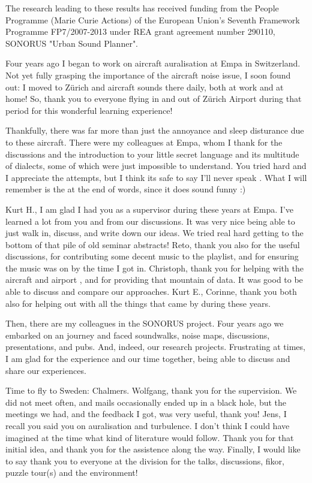 The research leading to these results has received funding from
the People Programme (Marie Curie Actions) of the European Union's Seventh
Framework Programme FP7/2007-2013 under REA grant agreement number 290110,
SONORUS "Urban Sound Planner".

Four years ago I began to work on aircraft auralisation at Empa in Switzerland.
Not yet fully grasping the importance of the aircraft noise issue, I soon found
out: I moved to Z\"{u}rich and  aircraft sounds there daily, both
at work and at home! So, thank you to everyone flying in and out of Z\"{u}rich
Airport during that period for this wonderful learning experience!

Thankfully, there was far more than just the annoyance and sleep disturance due to
these aircraft. There were my colleagues at Empa, whom I thank for the
discussions and the introduction to your little secret language and its
multitude of dialects, some of which were just impossible to understand. You
tried hard and I appreciate the attempts, but I think its safe to say I'll never
speak . What I will remember is the  at the end of
words, since it does sound funny :)

Kurt H., I am glad I had you as a supervisor during these years at Empa. I've
learned a lot from you and from our discussions. It was very nice being able to
just walk in, discuss, and write down our ideas. We tried real hard getting to
the bottom of that pile of old seminar abstracts! Reto, thank you also for the
useful discussions, for contributing some decent music to the playlist, and for
ensuring the music was on by the time I got in. Christoph, thank you for helping
with the aircraft and airport , and for providing that mountain of
data. It was good to be able to discuss and compare our approaches. Kurt E.,
Corinne, thank you both also for helping out with all the things that came by
during these years.

Then, there are my colleagues in the SONORUS project. Four years ago we embarked
on an  journey and faced soundwalks, noise maps,
discussions, presentations, and pubs. And, indeed, our research projects.
Frustrating at times, I am glad for the experience and our time together, being
able to discuss and share our experiences.

Time to fly to Sweden: Chalmers. Wolfgang, thank you for the supervision. We did
not meet often, and mails occasionally ended up in a black hole, but the meetings we
had, and the feedback I got, was very useful, thank you! Jens, I recall you said
you  on auralisation and turbulence. I don't think I could have
imagined at the time what kind of literature would follow. Thank you for that
initial idea, and thank you for the assistence along the way. Finally, I would
like to say thank you to everyone at the division for the talks, discussions,
fikor, puzzle tour(s) and the  environment!


%
%
%
